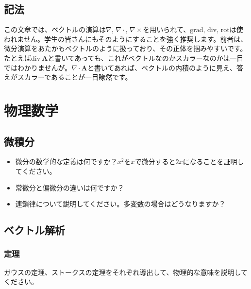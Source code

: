 \documentclass{ltjarticle}
\begin{document}
\subsection{記法}
この文章では、ベクトルの演算は$\nabla$, $\nabla\cdot$, $\nabla\times$を用いられて、$\mathrm{grad}$, $\mathrm{div}$, $\mathrm{rot}$は使われません。学生の皆さんにもそのようにすることを強く推奨します。前者は、微分演算をあたかもベクトルのように扱っており、その正体を掴みやすいです。たとえば$\mathrm{div}~\bm{A}$と書いてあっても、これがベクトルなのかスカラーなのかは一目ではわかりませんが。$\nabla\cdot\bm{A}$と書いてあれば、ベクトルの内積のように見え、答えがスカラーであることが一目瞭然です。

\section{物理数学}
\subsection{微積分}
\begin{itemize}
    \item 微分の数学的な定義は何ですか？$x^2$を$x$で微分すると$2x$になることを証明してください。
    \item 常微分と偏微分の違いは何ですか？
    \item 連鎖律について説明してください。多変数の場合はどうなりますか？
\end{itemize}
\subsection{ベクトル解析}
\subsubsection{定理}
ガウスの定理、ストークスの定理をそれぞれ導出して、物理的な意味を説明してください。
\end{document}
